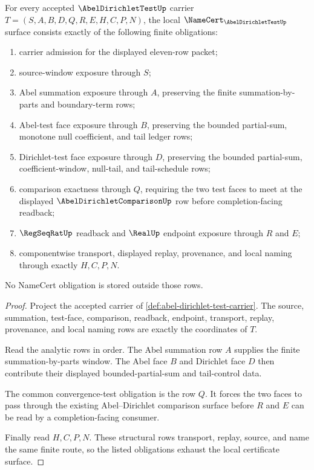 \begin{theorem}
\label{thm:abel-dirichlet-test-namecert-obligations}
For every accepted $\AbelDirichletTestUp$ carrier $T=(S,A,B,D,Q,R,E,H,C,P,N)$, the local $\NameCert_{\AbelDirichletTestUp}$ surface consists exactly of the following finite obligations:
\begin{enumerate}
\item carrier admission for the displayed eleven-row packet;
\item source-window exposure through $S$;
\item Abel summation exposure through $A$, preserving the finite summation-by-parts and boundary-term rows;
\item Abel-test face exposure through $B$, preserving the bounded partial-sum, monotone null coefficient, and tail ledger rows;
\item Dirichlet-test face exposure through $D$, preserving the bounded partial-sum, coefficient-window, null-tail, and tail-schedule rows;
\item comparison exactness through $Q$, requiring the two test faces to meet at the displayed $\AbelDirichletComparisonUp$ row before completion-facing readback;
\item $\RegSeqRatUp$ readback and $\RealUp$ endpoint exposure through $R$ and $E$;
\item componentwise transport, displayed replay, provenance, and local naming through exactly $H,C,P,N$.
\end{enumerate}
No NameCert obligation is stored outside those rows.
\end{theorem}
\begin{proof}
Project the accepted carrier of \autoref{def:abel-dirichlet-test-carrier}. The source, summation, test-face, comparison, readback, endpoint, transport, replay, provenance, and local naming rows are exactly the coordinates of $T$.

Read the analytic rows in order. The Abel summation row $A$ supplies the finite summation-by-parts window. The Abel face $B$ and Dirichlet face $D$ then contribute their displayed bounded-partial-sum and tail-control data.

The common convergence-test obligation is the row $Q$. It forces the two faces to pass through the existing Abel--Dirichlet comparison surface before $R$ and $E$ can be read by a completion-facing consumer.

Finally read $H,C,P,N$. These structural rows transport, replay, source, and name the same finite route, so the listed obligations exhaust the local certificate surface.
\end{proof}

